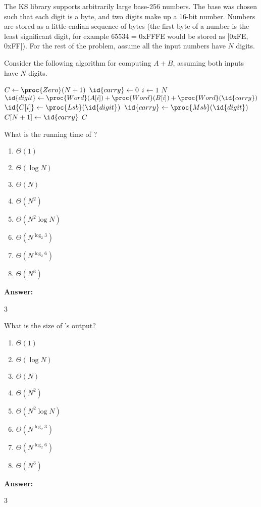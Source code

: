 \documentclass[12pt,twoside]{article}
\newcommand{\answer}{
 \par\medskip
 \textbf{Answer:}
}
\newcommand{\answerIa}{ \answer
3
}
\newcommand{\answerIb}{ \answer
3
}
\begin{document}
\begin{problems}
The KS library supports arbitrarily large base-256 numbers. The base was chosen
such that each digit is a byte, and two digits make up a 16-bit number. Numbers
are stored as a little-endian sequence of bytes (the first byte of a number is
the least significant digit, for example 65534 = 0xFFFE would be stored as
[0xFE, 0xFF]). For the rest of the problem, assume all the input numbers have
$N$ digits.

Consider the following algorithm for computing $A + B$, assuming both inputs
have $N$ digits.

\begin{codebox}
\li $C \gets \proc{Zero}(N + 1)$ 
\li $\id{carry} \gets 0$
\li \For $i \gets 1$ \To $N$ \label{li:add-for}
\li   \Do
        $\id{digit} \gets \proc{Word}(A[i]) + \proc{Word}(B[i]) +
        \proc{Word}(\id{carry})$
\li     $\id{C[i]} \gets \proc{Lsb}(\id{digit})$
\li     $\id{carry} \gets \proc{Msb}(\id{digit})$
      \End
\li $C[N + 1] \gets \id{carry}$
\li \Return $C$
\end{codebox}

\begin{problemparts}
\problempart {} What is the running time of ?
\begin{enumerate}
  \item $\Theta(1)$
  \item $\Theta(\log N)$
  \item $\Theta(N)$
  \item $\Theta(N^2)$
  \item $\Theta(N^2 \log N)$
  \item $\Theta(N^{\log_2 3})$
  \item $\Theta(N^{\log_2 6})$
  \item $\Theta(N^3)$
\end{enumerate}
\answerIa

\problempart {} What is the size of 's output?
\begin{enumerate}
  \item $\Theta(1)$
  \item $\Theta(\log N)$
  \item $\Theta(N)$
  \item $\Theta(N^2)$
  \item $\Theta(N^2 \log N)$
  \item $\Theta(N^{\log_2 3})$
  \item $\Theta(N^{\log_2 6})$
  \item $\Theta(N^3)$
\end{enumerate}
\answerIb


\end{problemparts}
\end{problems}
\end{document}
